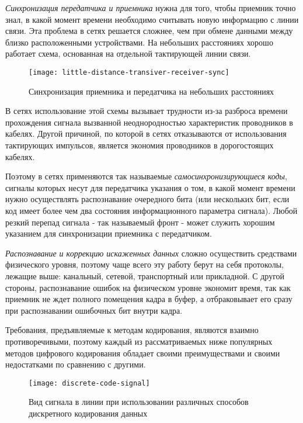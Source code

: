 \emph{Синхронизация передатчика и приемника} нужна для того, чтобы приемник точно знал, в какой момент времени необходимо считывать новую информацию с линии связи.
Эта проблема в сетях решается сложнее, чем при обмене данными между близко расположенными устройствами.
На небольших расстояниях хорошо работает схема, основанная на отдельной тактирующей линии связи.

\begin{figure}[!ht]
    \centering
    \texttt{[image: little-distance-transiver-receiver-sync]}
    \caption{Синхронизация приемника и передатчика на небольших расстояниях}
    \label{fig:little-distance-transiver-receiver-sync}
\end{figure}

В сетях использование этой схемы вызывает трудности из-за разброса времени прохождения сигнала вызванной неоднородностью характеристик проводников в кабелях.
Другой причиной, по которой в сетях отказываются от использования тактирующих импульсов, является экономия проводников в дорогостоящих кабелях.

Поэтому в сетях применяются так называемые \emph{самосинхронизирующиеся коды}, сигналы которых несут для передатчика указания о том, в какой момент времени нужно осуществлять распознавание очередного бита (или нескольких бит, если код имеет более чем два состояния информационного параметра сигнала).
Любой резкий перепад сигнала - так называемый фронт - может служить хорошим указанием для синхронизации приемника с передатчиком.

\emph{Распознавание и коррекцию искаженных данных} сложно осуществить средствами физического уровня, поэтому чаще всего эту работу берут на себя протоколы, лежащие выше: канальный, сетевой, транспортный или прикладной.
С другой стороны, распознавание ошибок на физическом уровне экономит время, так как приемник не ждет полного помещения кадра в буфер, а отбраковывает его сразу при распознавании ошибочных бит внутри кадра.

Требования, предъявляемые к методам кодирования, являются взаимно противоречивыми, поэтому каждый из рассматриваемых ниже популярных методов цифрового кодирования обладает своими преимуществами и своими недостатками по сравнению с другими.

\begin{figure}[!ht]
    \centering
    \texttt{[image: discrete-code-signal]}
    \caption{Вид сигнала в линии при использовании различных способов дискретного кодирования данных}
    \label{fig:discrete-code-signal}
\end{figure}


